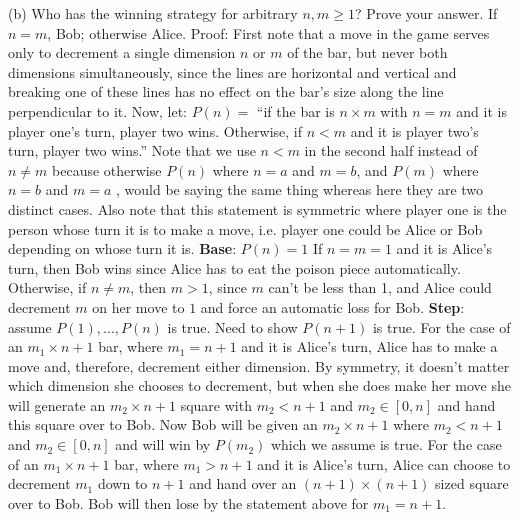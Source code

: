 \documentclass[12pt]{article}
\begin{document}
(b) Who has the winning strategy for arbitrary $n,m \geq 1$? Prove your answer.
\newline
\newline
If $n = m$, Bob; otherwise Alice.
\newline
\newline
Proof: 
\newline
First note that a move in the game serves only to decrement a single dimension $n $ or $m$ of the bar, but never both dimensions simultaneously, since
the lines are horizontal and vertical and breaking one of these lines has no effect on the bar's size along the line perpendicular to it. Now,
let:
\newline
\newline
$P(n) = $ ``if the bar is $n \times m$ with $n = m$ and it is player one's turn, player two wins. Otherwise, if $n < m$ and it is player two's turn, player two wins.''
\newline
Note that we use $n < m$ in the second half instead of $n \neq m$ because otherwise $P(n)$ where $n = a$ and $m = b$, and $P(m)$ where $n = b$ and $m = a$ , would be saying the same thing whereas here they are two distinct cases. Also note that this statement
is symmetric where player one is the person whose turn it is to make a move, i.e. player one could be Alice or Bob depending on whose turn it is.
\newline
\newline
\textbf{Base}: $P(n) = 1$
\newline
\newline
If $n = m = 1$ and it is Alice's turn, then Bob wins since Alice has to eat the poison piece automatically. 
\newline
\newline
Otherwise, if $n \neq m$, then 
$m > 1$, since $m$ can't be less than 1, and Alice could decrement $m$ on her move to $1$ and force an automatic loss for Bob.
\newline
\newline
\textbf{Step}: assume $P(1), ... , P(n)$ is true. Need to show $P(n+1)$ is true.
\newline
\newline
For the case of an $m_1 \times n+1$ bar, where $m_1 = n+1$ and it is Alice's turn, Alice has to make a move and, therefore, decrement either dimension. By symmetry, it
doesn't matter which dimension she chooses to decrement, but when she does make her move she will generate an  $m_2 \times n+1$ square with $m_2 < n+1$ and $m_2 \in [0,n]$ and
hand this square over to Bob. Now Bob will be given an $m_2 \times n+1$ where $m_2 < n+1$ and $m_2 \in [0,n]$ and will win by $P(m_2)$ which we assume is true.
\newline
\newline
For the case of an $m_1 \times n+1$ bar, where $m_1 > n+1$ and it is Alice's turn, Alice can choose to decrement $m_1$ down to $n+1$ and hand over an $(n+1) \times (n+1)$ sized square over to 
Bob. Bob will then lose by the statement above for $m_1 = n+1$.
\end{document}
